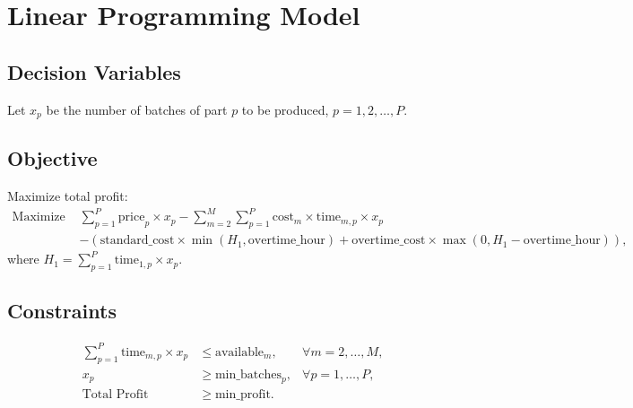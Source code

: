 \documentclass{article}
\begin{document}
\section*{Linear Programming Model}

\subsection*{Decision Variables}
Let \( x_p \) be the number of batches of part \( p \) to be produced, \( p = 1, 2, \ldots, P \).

\subsection*{Objective}
Maximize total profit:
\[
\begin{align*}
\text{Maximize } & \sum_{p=1}^{P} \text{price}_p \times x_p - \sum_{m=2}^{M} \sum_{p=1}^{P} \text{cost}_m \times \text{time}_{m,p} \times x_p \\
& - \left( \text{standard\_cost} \times \min(H_1, \text{overtime\_hour}) + \text{overtime\_cost} \times \max(0, H_1 - \text{overtime\_hour}) \right),
\end{align*}
\]
where \( H_1 = \sum_{p=1}^{P} \text{time}_{1,p} \times x_p \).

\subsection*{Constraints}
\begin{align*}
\sum_{p=1}^{P} \text{time}_{m,p} \times x_p & \leq \text{available}_m, & \forall m = 2, \ldots, M, \\
x_p & \geq \text{min\_batches}_p, & \forall p = 1, \ldots, P, \\
\text{Total Profit} & \geq \text{min\_profit}.
\end{align*}
\end{document}

